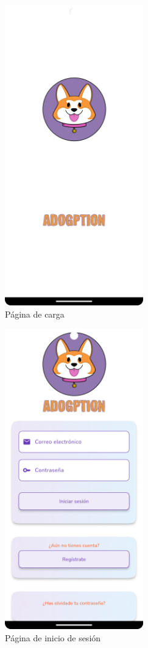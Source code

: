 \documentclass[a4paper, 12pt]{article}
\begin{document}
\begin{figure}[H]
	\begin{center}
		{\includegraphics[width=6cm]{app/Splashscreen.png}\par}
		\caption{Página de carga}
	\end{center}
\end{figure}

\begin{figure}[H]
	\begin{center}
		{\includegraphics[width=6cm]{app/Login.png}\par}
		\caption{Página de inicio de sesión}
	\end{center}
\end{figure}
\end{document}
